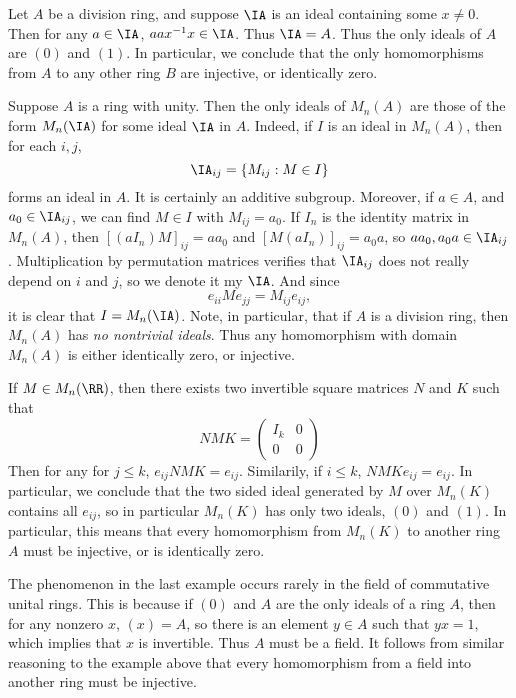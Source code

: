\begin{example}
    Let $A$ be a division ring, and suppose $\IA$ is an ideal containing some $x \neq 0$. Then for any $a \in \IA$, $a ax^{-1}x \in \IA$. Thus $\IA = A$. Thus the only ideals of $A$ are $(0)$ and $(1)$. In particular, we conclude that the only homomorphisms from $A$ to any other ring $B$ are injective, or identically zero.
\end{example}

\begin{example}
    Suppose $A$ is a ring with unity. Then the only ideals of $M_n(A)$ are those of the form $M_n(\IA)$ for some ideal $\IA$ in $A$. Indeed, if $I$ is an ideal in $M_n(A)$, then for each $i,j$,
    \[ \IA_{ij} = \{ M_{ij} : M \in I \} \]
    forms an ideal in $A$. It is certainly an additive subgroup. Moreover, if $a \in A$, and $a_0 \in \IA_{ij}$, we can find $M \in I$ with $M_{ij} = a_0$. If $I_n$ is the identity matrix in $M_n(A)$, then $[(aI_n)M]_{ij} = aa_0$ and $[M(aI_n)]_{ij} = a_0a$, so $aa_0, a_0a \in \IA_{ij}$. Multiplication by permutation matrices verifies that $\IA_{ij}$ does not really depend on $i$ and $j$, so we denote it my $\IA$. And since
    \[ e_{ii}Me_{jj} = M_{ij} e_{ij}, \]
    it is clear that $I = M_n(\IA)$. Note, in particular, that if $A$ is a division ring, then $M_n(A)$ has \emph{no nontrivial ideals}. Thus any homomorphism with domain $M_n(A)$ is either identically zero, or injective.
\end{example}

\begin{example}
    If $M \in M_n(\RR)$, then there exists two invertible square matrices $N$ and $K$ such that
    \[  NMK = \begin{pmatrix} I_k & 0 \\ 0 & 0 \end{pmatrix} \]
    Then for any for $j \leq k$, $e_{ij} NMK = e_{ij}$. Similarily, if $i \leq k$, $NMKe_{ij} = e_{ij}$. In particular, we conclude that the two sided ideal generated by $M$ over $M_n(K)$ contains all $e_{ij}$, so in particular $M_n(K)$ has only two ideals, $(0)$ and $(1)$. In particular, this means that every homomorphism from $M_n(K)$ to another ring $A$ must be injective, or is identically zero.
\end{example}

The phenomenon in the last example occurs rarely in the field of commutative unital rings. This is because if $(0)$ and $A$ are the only ideals of a ring $A$, then for any nonzero $x$, $(x) = A$, so there is an element $y \in A$ such that $yx = 1$, which implies that $x$ is invertible. Thus $A$ must be a field. It follows from similar reasoning to the example above that every homomorphism from a field into another ring must be injective.

